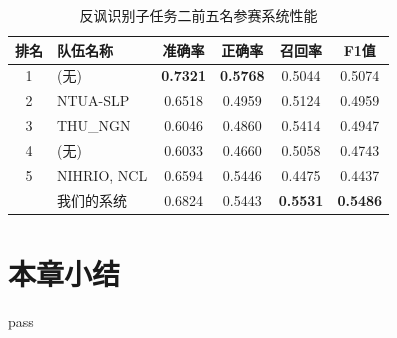 \begin{table}[htb]
  \centering
  \begin{minipage}[t]{0.8\linewidth}
  \caption{反讽识别子任务二前五名参赛系统性能}
  \label{tab:exp_irony_det_B_other_comp}
    \begin{tabularx}{\linewidth}{c|X|cccc}
    \toprule[1.5pt]
    排名 & 队伍名称 & 准确率 & 正确率 & 召回率 & F1值 \\
    \hline 
    1 & (无) & \bf 0.7321 & \bf 0.5768 & 0.5044 & 0.5074 \\
    2 & NTUA-SLP & 0.6518 & 0.4959 & 0.5124 & 0.4959 \\
    3 & THU\_NGN & 0.6046 & 0.4860 & 0.5414 & 0.4947 \\
    4 & (无) & 0.6033 & 0.4660 & 0.5058 & 0.4743 \\
    5 & NIHRIO, NCL & 0.6594 & 0.5446 & 0.4475 & 0.4437 \\
    \hline
    & 我们的系统 & 0.6824 & 0.5443 & \bf 0.5531 & \bf 0.5486 \\
    \bottomrule[1.5pt]
    \end{tabularx}
  \end{minipage}
\end{table}



\section{本章小结}

pass

